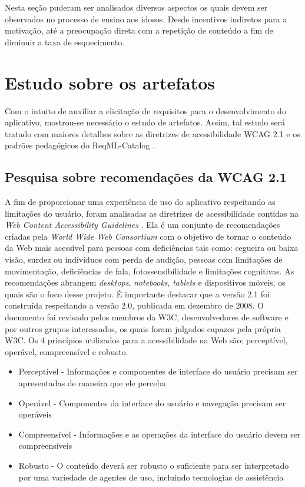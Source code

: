 Nesta seção puderam ser analisados diversos aspectos os quais devem ser observados no processo de ensino aos idosos. Desde incentivos indiretos para a motivação, até a preocupação direta com a repetição de conteúdo a fim de diminuir a taxa de esquecimento. 

\section{Estudo sobre os artefatos}
\label{subsec:artefatos}
Com o intuito de auxiliar a elicitação de requisitos para o desenvolvimento do aplicativo, mostrou-se necessário o estudo de artefatos.
Assim, tal estudo será tratado com maiores detalhes sobre as diretrizes de acessibilidade WCAG 2.1 e os padrões pedagógicos do ReqML-Catalog \citep{soad2017reqml}.

\subsection{Pesquisa sobre recomendações da WCAG 2.1}
A fim de proporcionar uma experiência de uso do aplicativo respeitando as limitações do usuário, foram analisadas as diretrizes de acessibilidade contidas na \textit{Web Content Accessibility Guidelines} \citep{wcag}. Ela é um conjunto de recomendações criadas pela
\textit{World Wide Web Consortium} \citep{w3c} com o objetivo de tornar o conteúdo da Web mais acessível para pessoas com deficiências tais como: cegueira ou baixa visão, surdez ou indivíduos com perda de audição, pessoas com limitações de movimentação, deficiências de fala, fotossensibilidade e limitações cognitivas. As recomendações abrangem \textit{desktops}, \textit{notebooks}, \textit{tablets} e dispositivos móveis, os quais são o foco desse projeto. É importante destacar que a versão 2.1 foi construída respeitando a versão 2.0, publicada em dezembro de 2008. O documento foi revisado pelos membros da W3C, desenvolvedores de software e por outros grupos interessados, os quais foram julgados capazes pela própria W3C. Os 4 princípios utilizados para a acessibilidade na Web são: perceptível, operável, compreensível e robusto.
\begin{itemize}
    \item Perceptível - Informações e componentes de interface do usuário precisam ser apresentadas de maneira que ele perceba
    \item Operável - Componentes da interface do usuário e navegação precisam ser operáveis
    \item Compreensível - Informações e as operações da interface do usuário devem ser compreensíveis
    \item Robusto - O conteúdo deverá ser robusto o suficiente para ser interpretado por uma variedade de agentes de uso, incluindo tecnologias de assistência
\end{itemize}

